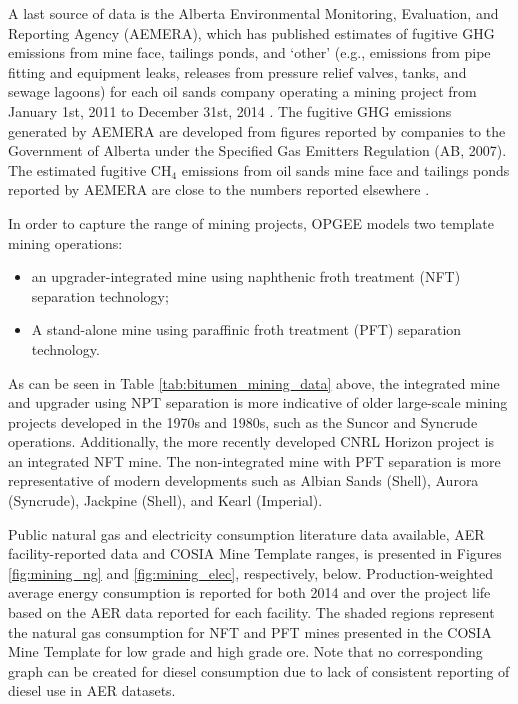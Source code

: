 \documentclass[11pt]{report}
\begin{document}
A last source of data is the Alberta Environmental Monitoring, Evaluation, and Reporting Agency (AEMERA), which has published estimates of fugitive GHG emissions from mine face, tailings ponds, and `other' (e.g., emissions from pipe fitting and equipment leaks, releases from pressure relief valves, tanks, and sewage lagoons) for each oil sands company operating a mining project from January 1st, 2011 to December 31st, 2014 \cite{AEMERA2015}. The fugitive GHG emissions generated by AEMERA are developed from figures reported by companies to the Government of Alberta under the Specified Gas Emitters Regulation (AB, 2007). The estimated fugitive CH$_4$ emissions from oil sands mine face and tailings ponds reported by AEMERA are close to the numbers reported elsewhere \cite{Johnson2016, GHGenius4.03}.

In order to capture the range of mining projects, OPGEE models two template mining operations: 
\begin{itemize}
\item an upgrader-integrated mine using naphthenic froth treatment (NFT) separation technology;
\item A stand-alone mine using paraffinic froth treatment (PFT) separation technology.
\end{itemize}

As can be seen in Table \ref{tab:bitumen_mining_data} above, the integrated mine and upgrader using NPT separation is more indicative of older large-scale mining projects developed in the 1970s and 1980s, such as the Suncor and Syncrude operations.  Additionally, the more recently developed CNRL Horizon project is an integrated NFT mine.  The non-integrated mine with PFT separation is more representative of modern developments such as Albian Sands (Shell), Aurora (Syncrude), Jackpine (Shell), and Kearl (Imperial). 

Public natural gas and electricity consumption literature data available, AER facility-reported data and COSIA Mine Template ranges, is presented in Figures \ref{fig:mining_ng} and \ref{fig:mining_elec}, respectively, below. Production-weighted average energy consumption is reported for both 2014 and over the project life based on the AER data reported for each facility. The shaded regions represent the natural gas consumption for NFT and PFT mines presented in the COSIA Mine Template for low grade and high grade ore. Note that no corresponding graph can be created for diesel consumption due to lack of consistent reporting of diesel use in AER datasets.
\end{document}
